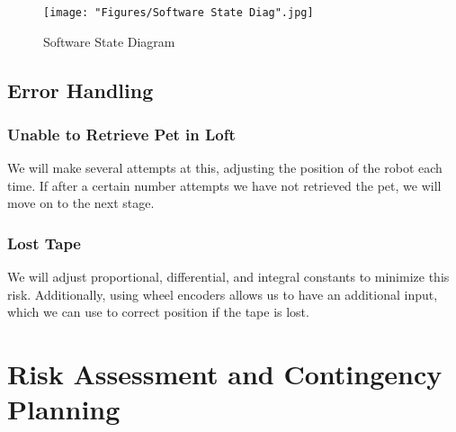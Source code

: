 \documentclass[11pt, oneside]{article} %
\begin{document}
\begin{figure}[h]
	\centering
	\texttt{[image: "Figures/Software State Diag".jpg]}
	\caption[Software State Diagram]{Software State Diagram}
	\label{fig:SoftStates}
\end{figure}

	\subsection{Error Handling}
		\subsubsection{Unable to Retrieve Pet in Loft}
		We will make several attempts at this, adjusting the position of the robot each time. If after a certain number attempts we have not retrieved the pet, we will move on to the next stage.
		\subsubsection{Lost Tape}
		We will adjust proportional, differential, and integral constants to minimize this risk. Additionally, using wheel encoders allows us to have an additional input, which we can use to correct position if the tape is lost.

\section{Risk Assessment and Contingency Planning}
\end{document}
